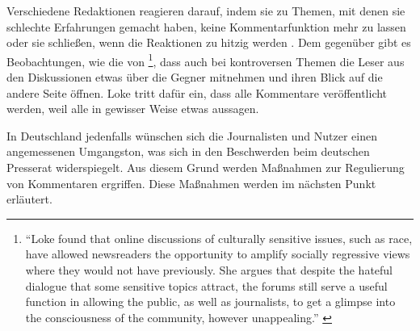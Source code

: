 Verschiedene Redaktionen reagieren darauf, indem sie zu Themen, mit denen sie
schlechte Erfahrungen gemacht haben, keine Kommentarfunktion mehr zu lassen oder
sie schließen, wenn die Reaktionen zu hitzig werden
\autocite[S.~4]{santana:2014}. Dem gegenüber gibt es Beobachtungen, wie die von
\textcite{loke}\footnote{``Loke found that online discussions of culturally
sensitive issues, such as race, have allowed newsreaders the opportunity to
amplify socially regressive views where they would not have previously. She
argues that despite the hateful dialogue that some sensitive topics attract, the
forums still serve a useful function in allowing the public, as well as
journalists, to get a glimpse into the consciousness of the community, however
unappealing.'' \autocite[S.~12]{santana:2014}}, dass auch bei kontroversen
Themen die Leser aus den Diskussionen etwas über die Gegner mitnehmen und ihren
Blick auf die andere Seite öffnen. Loke tritt dafür ein, dass alle Kommentare
veröffentlicht werden, weil alle in gewisser Weise etwas aussagen.

In Deutschland jedenfalls wünschen sich die Journalisten und Nutzer einen
angemessenen Umgangston, was sich in den Beschwerden beim deutschen Presserat
widerspiegelt. Aus diesem Grund werden Maßnahmen zur Regulierung von Kommentaren
ergriffen. Diese Maßnahmen werden im nächsten Punkt erläutert.

